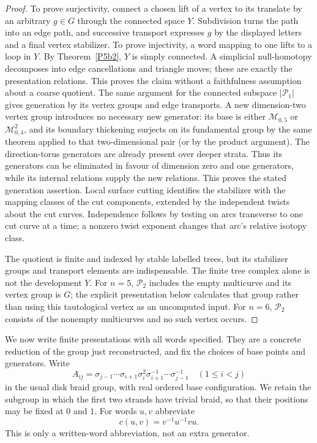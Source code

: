 \begin{proof}
To prove surjectivity, connect a chosen lift of a vertex to its
translate by an arbitrary $g\in G$ through the connected space
$Y$.  Subdivision turns the path into an edge path, and successive
transport expresses $g$ by the displayed letters and a final
vertex stabilizer.  To prove injectivity, a word mapping to one
lifts to a loop in $Y$.  By Theorem~\ref{P5b2}, $Y$ is simply
connected.  A simplicial null-homotopy decomposes into edge
cancellations and triangle moves; these are exactly the
presentation relations.  This proves the claim without a
faithfulness assumption about a coarse quotient.  The same
argument for the connected subspace $|\mathcal P_1|$ gives generation
by its vertex groups and edge transports.  A new dimension-two vertex
group introduces no necessary new generator: its base is either
$\mathcal M_{0,5}$ or $\mathcal M_{0,4}^2$, and its boundary
thickening surjects on its fundamental group by the same theorem
applied to that two-dimensional pair (or by the product argument).
The direction-torus generators are already present over deeper
strata.  Thus its generators can be eliminated in favour of dimension
zero and one generators, while its internal relations supply the
new relations.  This proves the stated generation assertion.  Local surface cutting identifies the
stabilizer with the mapping classes of the cut components,
extended by the independent twists about the cut curves.
Independence follows by testing on arcs transverse to one cut
curve at a time; a nonzero twist exponent changes that arc's
relative isotopy class.

The quotient is finite and indexed by stable labelled trees,
but its stabilizer groups and transport elements are indispensable.
The finite tree complex alone is not the development $Y$.
For $n=5$, $\mathcal P_2$ includes the empty multicurve and its
vertex group is $G$; the explicit presentation below calculates
that group rather than using this tautological vertex as an
uncomputed input.  For $n=6$, $\mathcal P_2$ consists of the
nonempty multicurves and no such vertex occurs.
\end{proof}

We now write finite presentations with all words specified.
They are a concrete reduction of the group just reconstructed,
and fix the choices of base points and generators.  Write
\[
 A_{ij}=\sigma_{j-1}\cdots\sigma_{i+1}\sigma_i^2
             \sigma_{i+1}^{-1}\cdots\sigma_{j-1}^{-1}
 \quad(1\le i<j)
\]
in the usual disk braid group, with real ordered base
configuration.  We retain the subgroup in which the first
two strands have trivial braid, so that their positions may be
fixed at $0$ and $1$.  For words $u,v$ abbreviate
\[
 c(u,v)=v^{-1}u^{-1}vu.
\]
This is only a written-word abbreviation, not an extra generator.

